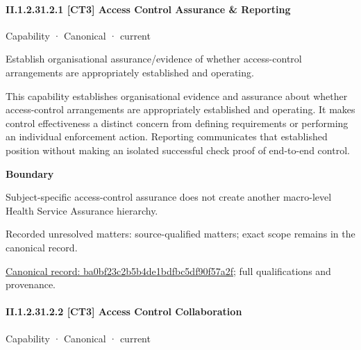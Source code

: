 \paragraph*{II.1.2.31.2.1 [CT3] Access Control Assurance \& Reporting}
\label{navigation:II.1.2.31.2.1}

\label{element:ba0bf23c2b5b4de1bdfbc5df90f57a2f}
{\small Capability · Canonical · current}\par

Establish organisational assurance/evidence of whether access-control arrangements are appropriately established and operating.



This capability establishes organisational evidence and assurance about whether access-control arrangements are appropriately established and operating. It makes control effectiveness a distinct concern from defining requirements or performing an individual enforcement action. Reporting communicates that established position without making an isolated successful check proof of end-to-end control.



\textbf{Boundary}



Subject-specific access-control assurance does not create another macro-level Health Service Assurance hierarchy.


{\small Recorded unresolved matters: source-qualified matters; exact scope remains in the canonical record.}\par
{\footnotesize \href{../../../../continuum/strategy/capability/ba0bf23c2b5b4de1bdfbc5df90f57a2f.md}{Canonical record: ba0bf23c2b5b4de1bdfbc5df90f57a2f}; full qualifications and provenance.}\par
\paragraph*{II.1.2.31.2.2 [CT3] Access Control Collaboration}
\label{navigation:II.1.2.31.2.2}

\label{element:c1a39b83d27a4a148f997c0a709e82ac}
{\small Capability · Canonical · current}\par

